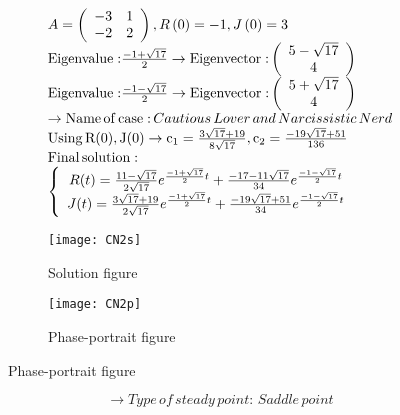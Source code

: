\documentclass[a4paper]{article}
\begin{document}
\[\begin{array}{l}
A = \left( {\begin{array}{*{20}{c}}
{ - 3}&1\\
{ - 2}&2
\end{array}} \right),R\left( 0 \right) =  - 1,J\left( 0 \right) = 3\\
{\rm{Eigenvalue:}}\frac{{ - 1 + \sqrt {17} }}{2} \to {\rm{Eigenvector:}}\left( {\begin{array}{*{20}{c}}
{5 - \sqrt {17} }\\
4
\end{array}} \right)\\
{\rm{Eigenvalue:}}\frac{{ - 1 - \sqrt {17} }}{2} \to {\rm{Eigenvector:}}\left( {\begin{array}{*{20}{c}}
{5 + \sqrt {17} }\\
4
\end{array}} \right)\\
 \to {\rm{Name}}\,{\rm{of}}\,{\rm{case:}}\,Cautious\,Lover\,and\,Narcissistic\,Nerd\\
{\rm{Using}}\,{\rm{R(0), J(0)}} \to {{\rm{c}}_1} = \frac{{3\sqrt {17}  + 19}}{{8\sqrt {17} }},{\rm{ }}{{\rm{c}}_2} = \frac{{ - 19\sqrt {17}  + 51}}{{136}}\\
{\rm{Final}}\,{\rm{solution:}}\\
\left\{ {\begin{array}{*{20}{c}}
{R(t) = \frac{{11 - \sqrt {17} }}{{2\sqrt {17} }}{e^{\frac{{ - 1 + \sqrt {17} }}{2}t}} + \frac{{ - 17 - 11\sqrt {17} }}{{34}}{e^{\frac{{ - 1 - \sqrt {17} }}{2}t}}}\\
{J(t) = \frac{{3\sqrt {17}  + 19}}{{2\sqrt {17} }}{e^{\frac{{ - 1 + \sqrt {17} }}{2}t}} + \frac{{ - 19\sqrt {17}  + 51}}{{34}}{e^{\frac{{ - 1 - \sqrt {17} }}{2}t}}}
\end{array}} \right.
\end{array}\]
\begin{figure}[H]
\centering
\begin{subfigure}{.5\textwidth}
  \centering
  \texttt{[image: CN2s]}
  \caption*{Solution figure}
\end{subfigure}%
\begin{subfigure}{.5\textwidth}
  \centering
  \texttt{[image: CN2p]}
  \caption*{Phase-portrait figure}
\end{subfigure}
\end{figure}
\[  \to  Type\,of\,steady\,point:\,Saddle\,point\]
\end{document}
